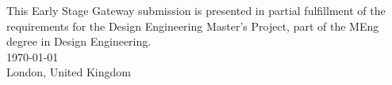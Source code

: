 \begin{titlepage}
\begin{center}
{\normalsize This Early Stage Gateway submission is presented in partial fulfillment of the}\\[0.2cm]
{\normalsize requirements for the Design Engineering Master’s Project, part of the MEng}\\[0.2cm]
{\normalsize degree in Design Engineering.}\\[1.0cm]

{\normalsize \today}\\[0.2cm]
{\normalsize London, United Kingdom}

\vfill

\end{center}
\end{titlepage}
